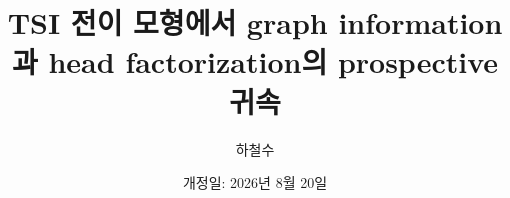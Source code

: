 \documentclass[11pt]{article}
\title{TSI 전이 모형에서 graph information과 head factorization의 prospective 귀속}
\author{하철수}
\date{개정일: 2026년 8월 20일}
\begin{document}
\maketitle








\begingroup
\raggedright


\endgroup
\end{document}
